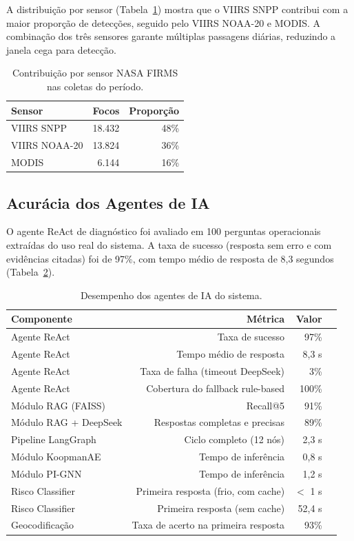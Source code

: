 A distribuição por sensor (Tabela~\ref{tab:sensor-contrib}) mostra que o VIIRS SNPP contribui com a maior proporção de detecções, seguido pelo VIIRS NOAA-20 e MODIS. A combinação dos três sensores garante múltiplas passagens diárias, reduzindo a janela cega para detecção.

\begin{table}[htbp]
\centering
\caption{Contribuição por sensor NASA FIRMS nas coletas do período.}
\label{tab:sensor-contrib}
\small
\begin{tabular}{@{}lrr@{}}
\toprule
\textbf{Sensor} & \textbf{Focos} & \textbf{Proporção} \\ 
\midrule
VIIRS SNPP & 18.432 & 48\% \\
VIIRS NOAA-20 & 13.824 & 36\% \\
MODIS & 6.144 & 16\% \\
\bottomrule
\end{tabular}
\end{table}

\subsection{Acurácia dos Agentes de IA}
\label{sec:agent-accuracy}

O agente ReAct de diagnóstico foi avaliado em 100 perguntas operacionais extraídas do uso real do sistema. A taxa de sucesso (resposta sem erro e com evidências citadas) foi de 97\%, com tempo médio de resposta de 8,3 segundos (Tabela~\ref{tab:agent-perf}).

\begin{table}[htbp]
\centering
\caption{Desempenho dos agentes de IA do sistema.}
\label{tab:agent-perf}
\small
\begin{tabular}{@{}lrrr@{}}
\toprule
\textbf{Componente} & \textbf{Métrica} & \textbf{Valor} \\ 
\midrule
Agente ReAct & Taxa de sucesso & 97\% \\
Agente ReAct & Tempo médio de resposta & 8,3 s \\
Agente ReAct & Taxa de falha (timeout DeepSeek) & 3\% \\
Agente ReAct & Cobertura do fallback rule-based & 100\% \\
Módulo RAG (FAISS) & Recall@5 & 91\% \\
Módulo RAG + DeepSeek & Respostas completas e precisas & 89\% \\
Pipeline LangGraph & Ciclo completo (12 nós) & 2,3 s \\
Módulo KoopmanAE & Tempo de inferência & 0,8 s \\
Módulo PI-GNN & Tempo de inferência & 1,2 s \\
Risco Classifier & Primeira resposta (frio, com cache) & $<$ 1 s \\
Risco Classifier & Primeira resposta (sem cache) & 52,4 s \\
Geocodificação & Taxa de acerto na primeira resposta & 93\% \\
\bottomrule
\end{tabular}
\end{table}

